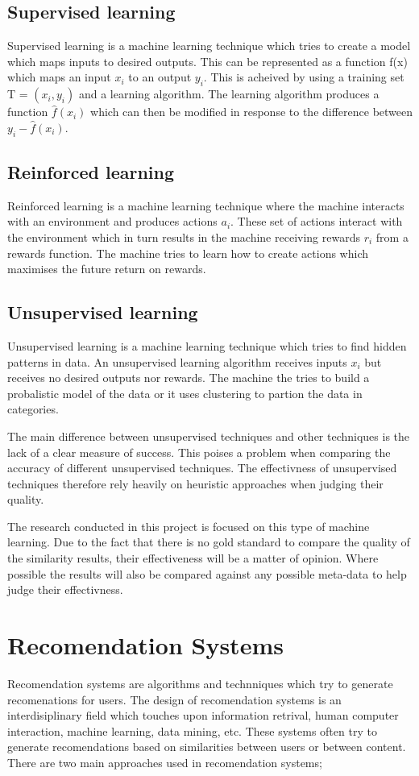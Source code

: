 \subsection{Supervised learning}
Supervised learning is a machine learning technique which tries to create a model which maps inputs to desired outputs.
This can be represented as a function f(x) which maps an input \(x_i\) to an output \(y_i\).
This is acheived by using a training set T = \((x_i, y_i)\) and a learning algorithm.
The learning algorithm produces a function \(\hat{f}(x_i)\) which can then be modified in response to the difference between \(y_i - \hat{f}(x_i)\).

\subsection{Reinforced learning}
Reinforced learning is a machine learning technique where the machine interacts with an environment and produces actions \(a_i\).
These set of actions interact with the environment which in turn results in the machine receiving rewards \(r_i\) from a rewards function.
The machine tries to learn how to create actions which maximises the future return on rewards.

\subsection{Unsupervised learning}
Unsupervised learning is a machine learning technique which tries to find hidden patterns in data.
An unsupervised learning algorithm receives inputs \(x_i\) but receives no desired outputs nor rewards.
The machine the tries to build a probalistic model of the data or it uses clustering to partion the data in categories.

The main difference between unsupervised techniques and other techniques is the lack of a clear measure of success.
This poises a problem when comparing the accuracy of different unsupervised techniques.
The effectivness of unsupervised techniques therefore rely heavily on heuristic approaches when judging their quality.

The research conducted in this project is focused on this type of machine learning.
Due to the fact that there is no gold standard to compare the quality of the similarity results, their effectiveness will be a matter of opinion.
Where possible the results will also be compared against any possible meta-data to help judge their effectivness.

\section{Recomendation Systems}
Recomendation systems are algorithms and technniques which try to generate recomenations for users.
The design of recomendation systems is an interdisiplinary field which touches upon information retrival, human computer interaction, machine learning, data mining, etc.
These systems often try to generate recomendations based on similarities between users or between content.
There are two main approaches used in recomendation systems;

